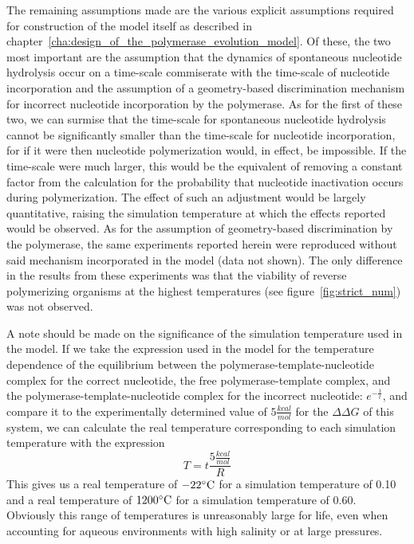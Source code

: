 The remaining assumptions made are the various explicit assumptions required for construction of the model itself as described in chapter~\ref{cha:design_of_the_polymerase_evolution_model}. Of these, the two most important are the assumption that the dynamics of spontaneous nucleotide hydrolysis occur on a time-scale commiserate with the time-scale of nucleotide incorporation and the assumption of a geometry-based discrimination mechanism for incorrect nucleotide incorporation by the polymerase. As for the first of these two, we can surmise that the time-scale for spontaneous nucleotide hydrolysis cannot be significantly smaller than the time-scale for nucleotide incorporation, for if it were then nucleotide polymerization would, in effect, be impossible. If the time-scale were much larger, this would be the equivalent of removing a constant factor from the calculation for the probability that nucleotide inactivation occurs during polymerization. The effect of such an adjustment would be largely quantitative, raising the simulation temperature at which the effects reported would be observed. As for the assumption of geometry-based discrimination by the polymerase, the same experiments reported herein were reproduced without said mechanism incorporated in the model (data not shown). The only difference in the results from these experiments was that the viability of reverse polymerizing organisms at the highest temperatures (see figure~\ref{fig:strict_num}) was not observed.

A note should be made on the significance of the simulation temperature used in the model. If we take the expression used in the model for the temperature dependence of the equilibrium between the polymerase-template-nucleotide complex for the correct nucleotide, the free polymerase-template complex, and the polymerase-template-nucleotide complex for the incorrect nucleotide: $e^{-\frac{1}{t}}$, and compare it to the experimentally determined value of $5 \frac{kcal}{mol}$ for the $\Delta\Delta G$ of this system, we can calculate the real temperature corresponding to each simulation temperature with the expression\[
	T = t \frac{5\frac{kcal}{mol}}{R}
\]
This gives us a real temperature of $-22^\circ \rm{C}$ for a simulation temperature of 0.10 and a real temperature of $1200^\circ \rm{C}$ for a simulation temperature of 0.60. Obviously this range of temperatures is unreasonably large for life, even when accounting for aqueous environments with high salinity or at large pressures.

